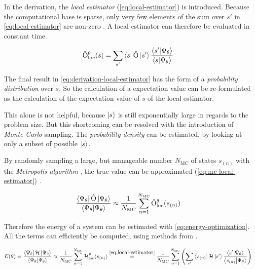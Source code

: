 In the derivation, the \emph{local estimator} (\autoref{eq:local-estimator}) is introduced. Because the computational base is sparse, only very few elements of the sum over $s'$ in \autoref{eq:local-estimator} are non-zero \cite{jVMCPaper}. A local estimator can therefore be evaluated in constant time.

\begin{equation}
    \label{eq:local-estimator}
    \hat{\mathrm{O}}_\mathrm{loc}^\theta(s) = \sum\limits_{s'} \bra{s} \hat{\mathrm{O}} \ket{s'} \frac{\bra{s'} \ket{\Psi_\theta}}{\bra{s} \ket{\Psi_\theta}}
\end{equation}

The final result in \autoref{eq:derivation-local-estimator} has the form of a \emph{probability distribution} over $s$.
So the calculation of a expectation value can be re-formulated as the calculation of the expectation value of $s$ of the local estimator.

This alone is not helpful, because $\ket{s}$ is still exponentially large in regards to the problem size.
But this shortcoming can be resolved with the introduction of \emph{Monte Carlo} sampling.
The \emph{probability density} can be estimated, by looking at only a subset of possible $\ket{s}$.

By randomly sampling a large, but manageable number $N_\mathrm{MC}$ of states $s_{(n)}$ with the \emph{Metropolis algorithm} \cite{quantumMonteCarloSimulationsOfSolids}, the true value can be approximated (\autoref{eq:mc-local-estimator}) \cite{jVMCPaper}.

\begin{equation}
    \label{eq:mc-local-estimator}
    \frac{\bra{\Psi_\theta}\hat{\mathrm{O}}\ket{\Psi_\theta}}{\bra{\Psi_\theta}\ket{\Psi_\theta}} \approx
    \frac{1}{N_\mathrm{MC}} \sum\limits_{n=1}^{N_\mathrm{MC}} \hat{\mathrm{O}}_\mathrm{loc}^\theta(s_{(n)})
\end{equation}

Therefore the energy of a system can be estimated with \autoref{eq:energy-optimization}. All the terms can efficiently be computed, using methods from .

\begin{equation}
    \label{eq:energy-optimization}
    E(\theta) = \frac{\bra{\Psi_\theta}\mathcal{H}\ket{\Psi_\theta}}{\bra{\Psi_\theta}\ket{\Psi_\theta}} \approx
    \frac{1}{N_\mathrm{MC}} \sum\limits_{n=1}^{N_\mathrm{MC}} \mathcal{H}_\mathrm{loc}^\theta(s_{(n)}) \stackrel{\ref{eq:local-estimator}}{=}
    \frac{1}{N_\mathrm{MC}} \sum\limits_{n=1}^{N_\mathrm{MC}} \left(\sum\limits_{s'} \bra{s_{(n)}} \mathcal{H} \ket{s'} \frac{\bra{s'} \ket{\Psi_\theta}}{\bra{s_{(n)}} \ket{\Psi_\theta}}\right)
\end{equation}

